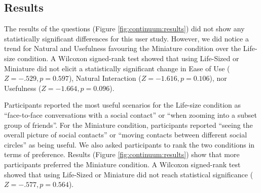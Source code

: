 \subsection{Results}

The results of the questions (Figure \ref{fig:continuum:results}) did not show any statistically significant differences for this user study. However, we did notice a trend for Natural and Usefulness favouring the Miniature condition over the Life-size condition. A Wilcoxon signed-rank test showed that using Life-Sized or Miniature did not elicit a statistically significant change in Ease of Use ($Z=-.529, p=0.597$), Natural Interaction ($Z=-1.616, p=0.106$), nor Usefulness ($Z=-1.664, p=0.096$). 

Participants reported the most useful scenarios for the Life-size condition as \enquote{face-to-face conversations with a social contact} or \enquote{when zooming into a subset group of friends}. For the Miniature condition, participants reported \enquote{seeing the overall picture of social contacts} or \enquote{moving contacts between different social circles} as being useful. We also asked participants to rank the two conditions in terms of preference. Results (Figure \ref{fig:continuum:results}) show that more participants preferred the Miniature condition. A Wilcoxon signed-rank test showed that using Life-Sized or Miniature did not reach statistical significance ($Z=-.577, p=0.564$).

